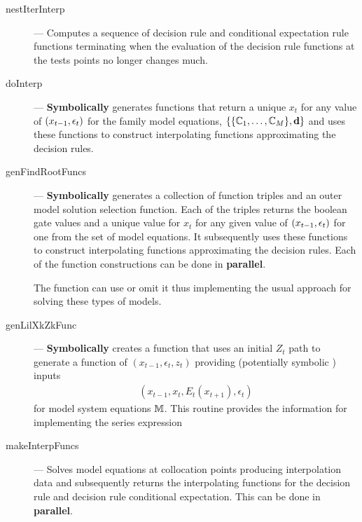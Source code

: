 \documentclass[12pt]{article}
\begin{document}
\begin{description}
\item[nestIterInterp] --- Computes a sequence of decision rule and conditional expectation rule functions terminating when the evaluation of the decision rule 
functions at the tests points no longer changes much.
\item[doInterp] --- {\bf Symbolically} generates functions that return a unique $x_t$ for any value of $(x_{t-1},\epsilon_t)$ for the family model equations, $\{\{\mathbb{C}_{1},\ldots,\mathbb{C}_{M}\},\mathbf{d}\}$ and uses these functions to construct interpolating functions approximating the decision rules.
\item[genFindRootFuncs] --- {\bf Symbolically} generates a collection of function triples
and an outer 
model solution selection function. Each of the triples
 returns the boolean gate values and a unique value for 
$x_t$ for any given value of $(x_{t-1},\epsilon_t)$ 
for one from the set of  model equations. It
 subsequently uses these 
functions to construct interpolating functions approximating the 
decision rules.
Each of the function constructions can be done in {\bf parallel}.

The function can use  or omit it thus implementing the usual
approach for solving these types of models.
\item[genLilXkZkFunc] --- {\bf Symbolically} creates a function that uses an initial $Z_t$ path to generate a function of $(x_{t-1},\epsilon_t,z_t)$ providing (potentially symbolic ) inputs 
  \begin{gather*}
(x_{t-1},x_t,E_t(x_{t+1}),\epsilon_t)    
  \end{gather*}
 for model system equations $\mathbb{M}$.  This  routine  provides the information for
implementing the series expression 
\item[makeInterpFuncs] --- Solves model equations at collocation points 
producing interpolation data and subsequently returns the  
 interpolating functions for the decision rule and decision rule conditional expectation.  This can be done in {\bf parallel}.
\end{description}




  
\end{document}
